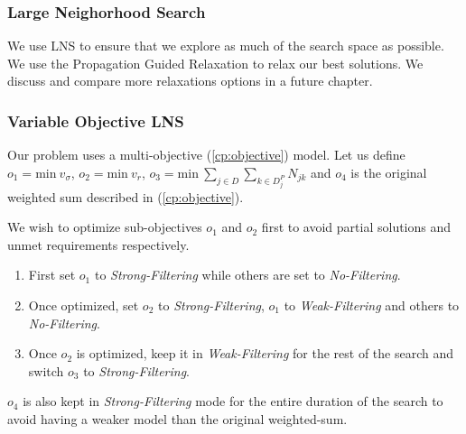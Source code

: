 \documentclass[../../thesis.tex]{subfiles}
\begin{document}
\subsubsection{Large Neighorhood Search}

We use LNS to ensure that we explore as much of the search space as possible. 
We use the Propagation Guided Relaxation \cite{Propagation:LNS} to relax our best solutions.
We discuss and compare more relaxations options in a future chapter.

\subsubsection{Variable Objective LNS}

Our problem uses a multi-objective (\ref{cp:objective}) model. 
Let us define $o_1 = \text{min} \ v_{\sigma}$, $o_2 = {\text{min} \ v_r}$, $o_3 = {\text{min} \ \sum_{j \in D} \sum_{k \in D^P_j} N_{jk}}$
and $o_4$ is the original weighted sum described in (\ref{cp:objective}).


We wish to optimize sub-objectives $o_1$ and $o_2$ first to avoid partial solutions and unmet requirements respectively. 

\begin{enumerate}
  \item First set $o_1$ to \emph{Strong-Filtering} while others are set to \emph{No-Filtering}.
  \item Once optimized, set $o_2$ to \emph{Strong-Filtering}, $o_1$ to \emph{Weak-Filtering} and others to \emph{No-Filtering}.
  \item Once $o_2$ is optimized, keep it in \emph{Weak-Filtering} for the rest of the search and switch $o_3$ to \emph{Strong-Filtering}.
\end{enumerate}

$o_4$ is also kept in \emph{Strong-Filtering} mode for the entire duration of the search to avoid having a weaker model than the original weighted-sum.
\end{document}
